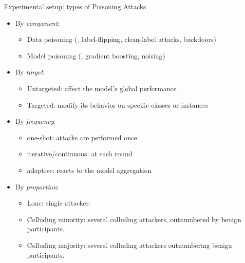 \begin{frame}{Experimental setup: types of Poisoning Attacks}
  \begin{itemize}[<+->]
    \item By \emph{component}:
    \begin{itemize}[<.->]
      \item Data poisoning (\eg, \alert<5>{label-flipping}, clean-label attacks, backdoors)
      \item Model poisoning (\eg, gradient boosting, noising)
    \end{itemize}\emph{}

    \item By \emph{target}:
    \begin{itemize}[<.->]
      \item \alert<5>{Untargeted}: affect the model's global performance
      \item \alert<5>{Targeted}: modify its behavior on specific classes or instances
    \end{itemize}

    \item By \emph{frequency}:
    \begin{itemize}[<.->]
      \item one-shot: attacks are performed once
      \item \alert<5>{iterative}/\alert<5>{continuous}: at each round
      \item adaptive: reacts to the model aggregation
    \end{itemize}
    \item By \emph{proportion}:
    \begin{itemize}[<.->]
      \item \alert<5>{Lone}: single attacker.
      \item \alert<5>{Colluding minority}: several colluding attackers, outnumbered by benign participants. 
      \item \alert<5>{Colluding majority}: several colluding attackers outnumbering benign participants.
    \end{itemize}
  \end{itemize}
\end{frame}

